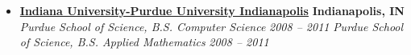 %
\begin{itemize}
    \parskip=0.1em

    \item
    \headerrow
        {\textbf{\href{https://www.iupui.edu/}{Indiana University-Purdue University Indianapolis}}}
        {\textbf{Indianapolis, IN}}
    \\
    \headerrow
        {\emph{Purdue School of Science, B.S. Computer Science}}
        {\emph{2008 -- 2011}}
    \headerrow
        {\emph{Purdue School of Science, B.S. Applied Mathematics}}
        {\emph{2008 -- 2011}}


\end{itemize}
